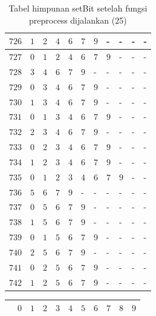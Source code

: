 \begin{appendices}
\begin{table}[H]
\begin{tabular} {|l|l|l|l|l|l|l|l|l|l|l|}
  		$ 726 $ & $ 1 $ &$ 2 $ &$ 4 $ &$ 6 $ &$ 7 $ &$ 9 $ & - &  - &  - &  -   \\ \hline
  		$ 727 $ & $ 0 $ &$ 1 $ &$ 2 $ &$ 4 $ &$ 6 $ &$ 7 $ &$ 9 $ & - &  - &  -   \\ \hline
  		$ 728 $ & $ 3 $ &$ 4 $ &$ 6 $ &$ 7 $ &$ 9 $ & - &  - &  - &  - &  -   \\ \hline
  		$ 729 $ & $ 0 $ &$ 3 $ &$ 4 $ &$ 6 $ &$ 7 $ &$ 9 $ & - &  - &  - &  -   \\ \hline
  		$ 730 $ & $ 1 $ &$ 3 $ &$ 4 $ &$ 6 $ &$ 7 $ &$ 9 $ & - &  - &  - &  -   \\ \hline
  		$ 731 $ & $ 0 $ &$ 1 $ &$ 3 $ &$ 4 $ &$ 6 $ &$ 7 $ &$ 9 $ & - &  - &  -   \\ \hline
  		$ 732 $ & $ 2 $ &$ 3 $ &$ 4 $ &$ 6 $ &$ 7 $ &$ 9 $ & - &  - &  - &  -   \\ \hline
  		$ 733 $ & $ 0 $ &$ 2 $ &$ 3 $ &$ 4 $ &$ 6 $ &$ 7 $ &$ 9 $ & - &  - &  -   \\ \hline
  		$ 734 $ & $ 1 $ &$ 2 $ &$ 3 $ &$ 4 $ &$ 6 $ &$ 7 $ &$ 9 $ & - &  - &  -   \\ \hline
  		$ 735 $ & $ 0 $ &$ 1 $ &$ 2 $ &$ 3 $ &$ 4 $ &$ 6 $ &$ 7 $ &$ 9 $ & - &  -   \\ \hline
  		$ 736 $ & $ 5 $ &$ 6 $ &$ 7 $ &$ 9 $ & - &  - &  - &  - &  - &  -   \\ \hline
  		$ 737 $ & $ 0 $ &$ 5 $ &$ 6 $ &$ 7 $ &$ 9 $ & - &  - &  - &  - &  -   \\ \hline
  		$ 738 $ & $ 1 $ &$ 5 $ &$ 6 $ &$ 7 $ &$ 9 $ & - &  - &  - &  - &  -   \\ \hline
  		$ 739 $ & $ 0 $ &$ 1 $ &$ 5 $ &$ 6 $ &$ 7 $ &$ 9 $ & - &  - &  - &  -   \\ \hline
  		$ 740 $ & $ 2 $ &$ 5 $ &$ 6 $ &$ 7 $ &$ 9 $ & - &  - &  - &  - &  -   \\ \hline
  		$ 741 $ & $ 0 $ &$ 2 $ &$ 5 $ &$ 6 $ &$ 7 $ &$ 9 $ & - &  - &  - &  -   \\ \hline
  		$ 742 $ & $ 1 $ &$ 2 $ &$ 5 $ &$ 6 $ &$ 7 $ &$ 9 $ & - &  - &  - &  -   \\ \hline
  	\end{tabular}\caption{Tabel himpunan setBit setelah fungsi preprocess dijalankan (25)}
  	\label{tab:setbit_25}
  \end{table}
  \begin{table}[H]
  	\centering
  	\begin{tabular} {|l|l|l|l|l|l|l|l|l|l|l|} \hline
  		\backslashbox{$Num$}{$index$} & $ 0 $ & $ 1 $ & $ 2 $ & $ 3 $ & $ 4 $ & $ 5 $ & $ 6 $ & $ 7 $ & $ 8 $ & $ 9 $ \\ \hline

\end{tabular}
\end{table}
\end{appendices}
